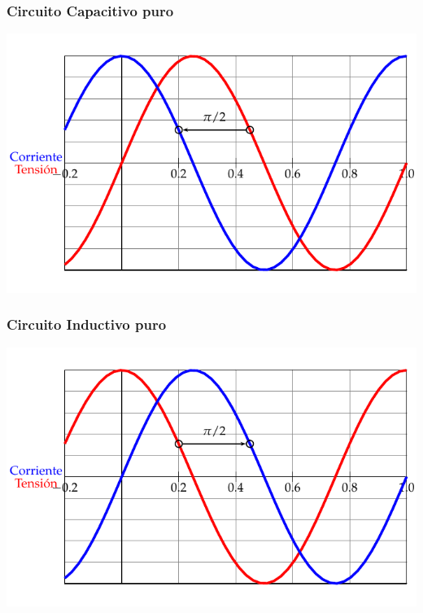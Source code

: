 \documentclass[serif, xcolor=dvipsnames]{beamer}
\begin{document}
\begin{frame}[plain]
  \frametitle{Circuito Capacitivo puro}

  \begin{center}
    \includegraphics{../figs/PlotCircuitoCapacitivoPuro}
    \par\end{center}


\end{frame}
\begin{frame}[plain]
  \frametitle{Circuito Inductivo puro}

  \begin{center}
    \includegraphics{../figs/PlotCircuitoInductivoPuro}
    \par\end{center}


\end{frame}
\end{document}
